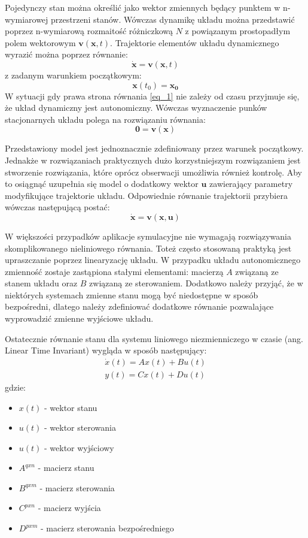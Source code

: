 \documentclass[12pt, oneside]{report}
\theoremstyle{definition}
\begin{document}
Pojedynczy stan można określić jako wektor zmiennych będący punktem w n-wymiarowej przestrzeni stanów. Wówczas dynamikę układu można przedstawić poprzez n-wymiarową rozmaitość różniczkową \(N\) z powiązanym prostopadłym polem wektorowym \(\mathbf{v}(\mathbf{x},t)\). Trajektorie elementów układu dynamicznego wyrazić można poprzez równanie:
\begin{equation} \label{eq_1}
\dot{\mathbf{x}} = \mathbf{v}(\mathbf{x},t)
\end{equation}
z zadanym warunkiem początkowym:
\begin{equation}
\mathbf{x}(t_0) = \mathbf{x_0}
\end{equation}
W sytuacji gdy prawa strona równania \ref{eq_1} nie zależy od czasu przyjmuje się, że układ dynamiczny jest autonomiczny. Wówczas wyznaczenie punków stacjonarnych układu polega na rozwiązaniu równania:
\begin{equation}
\mathbf{0} = \mathbf{v}(\mathbf{x})
\end{equation}

Przedstawiony model jest jednoznacznie zdefiniowany przez warunek początkowy. Jednakże w rozwiązaniach praktycznych dużo korzystniejszym rozwiązaniem jest stworzenie rozwiązania, które oprócz obserwacji umożliwia również kontrolę. Aby to osiągnąć uzupełnia się model o dodatkowy wektor \(\mathbf{u}\) zawierający parametry modyfikujące trajektorie układu. Odpowiednie równanie trajektorii przybiera wówczas następującą postać:
\begin{equation}
\dot{\mathbf{x}} = \mathbf{v}(\mathbf{x},\mathbf{u})
\end{equation}

W większości przypadków aplikacje symulacyjne nie wymagają rozwiązywania skomplikowanego nieliniowego równania. Toteż często stosowaną praktyką jest upraszczanie poprzez linearyzację układu. W przypadku układu autonomicznego zmienność zostaje zastąpiona stałymi elementami: macierzą \(A\) związaną ze stanem układu oraz \(B\) związaną ze sterowaniem. Dodatkowo należy przyjąć, że w niektórych systemach zmienne stanu mogą być niedostępne w sposób bezpośredni, dlatego należy zdefiniować dodatkowe równanie pozwalające wyprowadzić zmienne wyjściowe układu.

Ostatecznie równanie stanu dla systemu liniowego niezmienniczego w czasie (ang. Linear Time Invariant) wygląda w sposób następujący:
\begin{gather}
\dot{x}(t) = Ax(t) + Bu(t) \\
y(t) = Cx(t) + Du(t)
\end{gather}
gdzie:
\begin{itemize}
\item \(x(t)\) - wektor stanu
\item \(u(t)\) - wektor sterowania
\item \(u(t)\) - wektor wyjściowy
\item \(A^{qxn}\) - macierz stanu
\item \(B^{qxm}\) - macierz sterowania
\item \(C^{pxn}\) - macierz wyjścia
\item \(D^{pxm}\) - macierz sterowania bezpośredniego
\end{itemize}
\end{document}
